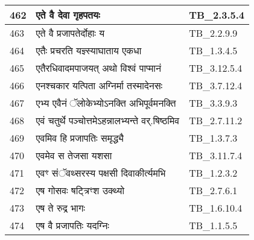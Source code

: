 \documentclass[17pt]{extarticle}
\begin{document}
\begin{longtable}{||p{0.4in}||p{4.9in}||p{0.9in}||}
    462 & एते वै देवा गृहपतयः & TB\_2.3.5.4       \\
    
    \hline
        
    463 & एते वै प्रजापतेर्दोहाः य & TB\_2.2.9.9       \\
    
    \hline
        
    464 & एतैः प्रचरति यज्ञ्स्याघाताय एकधा & TB\_1.3.4.5       \\
    
    \hline
        
    465 & एतैरधिवादमपाजयत् अथो विश्वं पाप्मानं & TB\_3.12.5.4       \\
    
    \hline
        
    466 & एनश्चकार यत्पिता अग्निर्मा तस्मादेनसः & TB\_3.7.12.4       \\
    
    \hline
        
    467 & एभ्य एवैनं ॅलोकेभ्योऽनक्ति अभिपूर्वमनक्ति & TB\_3.3.9.3       \\
    
    \hline
        
    468 & एवं चतुर्थे पञ्चोत्तमेऽहन्नालभ्यन्ते वर्.षिष्ठमिव & TB\_2.7.11.2       \\
    
    \hline
        
    469 & एवमिव हि प्रजापतिः समृद्ध्यै & TB\_1.3.7.3       \\
    
    \hline
        
    470 & एवमेव स तेजसा यशसा & TB\_3.11.7.4       \\
    
    \hline
        
    471 & एवꣳ संॅवथ्सरस्य पक्षसी दिवाकीर्त्यमभि & TB\_1.2.3.2       \\
    
    \hline
        
    472 & एष गोसवः षट्त्रिꣳश उक्थ्यो & TB\_2.7.6.1       \\
    
    \hline
        
    473 & एष ते रुद्र भागः & TB\_1.6.10.4       \\
    
    \hline
        
    474 & एष वै प्रजापतिः यदग्निः & TB\_1.1.5.5       \\
    

\end{longtable}
\end{document}

